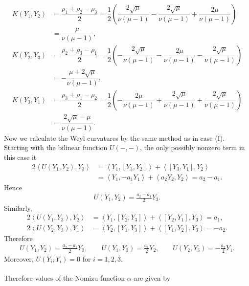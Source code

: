 \documentclass[12pt]{article}
\begin{document}
\begin{align*}
    K(Y_1,Y_2)
    &=
    \dfrac{\rho_1+\rho_2-\rho_3}{2} =
    \dfrac{1}{2}\left(
    \dfrac{2\sqrt{\mu}}{\nu(\mu-1)}
    -
    \dfrac{2\sqrt{\mu}}{\nu(\mu-1)}
    +
    \dfrac{2\mu}{\nu(\mu-1)}\right) \\
    &=
    \dfrac{\mu}{\nu(\mu-1)}, \\[1em]
    K(Y_2,Y_3)
    &=
    \dfrac{\rho_2+\rho_3-\rho_1}{2} =
    \dfrac{1}{2}\left(
    -\dfrac{2\sqrt{\mu}}{\nu(\mu-1)}
    -
    \dfrac{2\mu}{\nu(\mu-1)}
    -
    \dfrac{2\sqrt{\mu}}{\nu(\mu-1)}\right) \\
    &=
    -\dfrac{\mu+2\sqrt{\mu}}{\nu(\mu-1)}, \\[1em]
    K(Y_3,Y_1)
    &=
    \dfrac{\rho_3+\rho_1-\rho_2}{2} =
    \dfrac{1}{2}\left(
    -\dfrac{2\mu}{\nu(\mu-1)}
    +
    \dfrac{2\sqrt{\mu}}{\nu(\mu-1)}
    +
    \dfrac{2\sqrt{\mu}}{\nu(\mu-1)}\right) \\
    &=
    \dfrac{2\sqrt{\mu}-\mu}{\nu(\mu-1)}.
\end{align*}
Now we calculate the Weyl curvatures by the same method as in case (I).
Starting with the bilinear function $U(-,-)$, the only possibly nonzero term in this case it
\begin{align*}
    2\left\langle U(Y_1,Y_2),Y_3 \right\rangle
    &=\left\langle Y_1,[Y_3,Y_2] \right\rangle+\left\langle [Y_3,Y_1],Y_2 \right\rangle \\
    &=\left\langle Y_1,-a_1Y_1 \right\rangle+\left\langle a_2Y_2,Y_2 \right\rangle
    =a_2-a_1.
\end{align*}
Hence
\begin{align*}
    U(Y_1,Y_2)=\frac{a_2-a_1}{2}Y_3.
\end{align*}
Similarly,
\begin{align*}
    2\left\langle U(Y_1,Y_3),Y_2 \right\rangle
    &=\left\langle Y_1,[Y_2,Y_3] \right\rangle+\left\langle [Y_2,Y_1],Y_3 \right\rangle=a_1, \\
    2\left\langle U(Y_2,Y_3),Y_1 \right\rangle
    &=\left\langle Y_2,[Y_1,Y_3] \right\rangle+\left\langle [Y_1,Y_2],Y_3 \right\rangle=-a_2.
\end{align*}
Therefore
\begin{align*}
    U(Y_1,Y_2)=\frac{a_2-a_1}{2}Y_3,
    \qquad
    U(Y_1,Y_3)=\frac{a_1}{2}Y_2,
    \qquad
    U(Y_2,Y_3)=-\frac{a_2}{2}Y_1.
\end{align*}
Moreover, $U(Y_i,Y_i)=0$ for $i=1,2,3$. \\~\\ Therefore values of the Nomizu function $\alpha$ are given by
\end{document}
